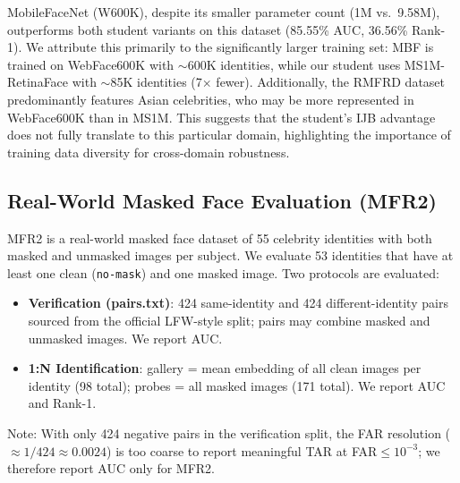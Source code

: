 MobileFaceNet (W600K), despite its smaller parameter count (1M vs.\ 9.58M), outperforms both student variants on this dataset (85.55\% AUC, 36.56\% Rank-1). We attribute this primarily to the significantly larger training set: MBF is trained on WebFace600K with $\sim$600K identities, while our student uses MS1M-RetinaFace with $\sim$85K identities (7$\times$ fewer). Additionally, the RMFRD dataset predominantly features Asian celebrities, who may be more represented in WebFace600K than in MS1M. This suggests that the student's IJB advantage does not fully translate to this particular domain, highlighting the importance of training data diversity for cross-domain robustness.

\subsection{Real-World Masked Face Evaluation (MFR2)}

MFR2 is a real-world masked face dataset of 55 celebrity identities with both masked and unmasked images per subject. We evaluate 53 identities that have at least one clean (\texttt{no-mask}) and one masked image. Two protocols are evaluated:

\begin{itemize}
    \item \textbf{Verification (pairs.txt)}: 424 same-identity and 424 different-identity pairs sourced from the official LFW-style split; pairs may combine masked and unmasked images. We report AUC.
    \item \textbf{1:N Identification}: gallery = mean embedding of all clean images per identity (98 total); probes = all masked images (171 total). We report AUC and Rank-1.
\end{itemize}

Note: With only 424 negative pairs in the verification split, the FAR resolution ($\approx 1/424 \approx 0.0024$) is too coarse to report meaningful TAR at FAR$\leq10^{-3}$; we therefore report AUC only for MFR2.

\begin{table}[h]
\centering
\caption{MFR2 evaluation (53 paired identities). Verification: pairs.txt AUC (mixed masked/clean pairs). Identification: 1:N AUC and Rank-1 with clean gallery and masked probes.}
\label{tab:mfr2}
\end{table}

